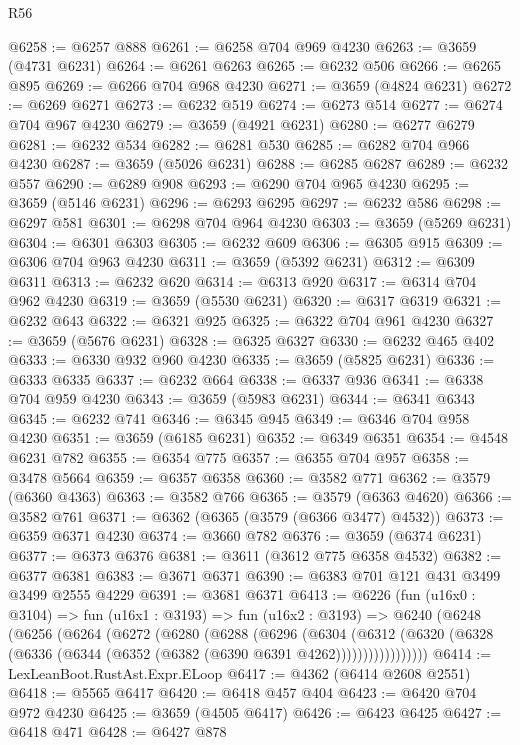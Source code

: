 \begin{lexlean}{R56}
\begin{coremodule}
@6258 := @6257 @888
@6261 := @6258 @704 @969 @4230
@6263 := @3659 (@4731 @6231)
@6264 := @6261 @6263
@6265 := @6232 @506
@6266 := @6265 @895
@6269 := @6266 @704 @968 @4230
@6271 := @3659 (@4824 @6231)
@6272 := @6269 @6271
@6273 := @6232 @519
@6274 := @6273 @514
@6277 := @6274 @704 @967 @4230
@6279 := @3659 (@4921 @6231)
@6280 := @6277 @6279
@6281 := @6232 @534
@6282 := @6281 @530
@6285 := @6282 @704 @966 @4230
@6287 := @3659 (@5026 @6231)
@6288 := @6285 @6287
@6289 := @6232 @557
@6290 := @6289 @908
@6293 := @6290 @704 @965 @4230
@6295 := @3659 (@5146 @6231)
@6296 := @6293 @6295
@6297 := @6232 @586
@6298 := @6297 @581
@6301 := @6298 @704 @964 @4230
@6303 := @3659 (@5269 @6231)
@6304 := @6301 @6303
@6305 := @6232 @609
@6306 := @6305 @915
@6309 := @6306 @704 @963 @4230
@6311 := @3659 (@5392 @6231)
@6312 := @6309 @6311
@6313 := @6232 @620
@6314 := @6313 @920
@6317 := @6314 @704 @962 @4230
@6319 := @3659 (@5530 @6231)
@6320 := @6317 @6319
@6321 := @6232 @643
@6322 := @6321 @925
@6325 := @6322 @704 @961 @4230
@6327 := @3659 (@5676 @6231)
@6328 := @6325 @6327
@6330 := @6232 @465 @402
@6333 := @6330 @932 @960 @4230
@6335 := @3659 (@5825 @6231)
@6336 := @6333 @6335
@6337 := @6232 @664
@6338 := @6337 @936
@6341 := @6338 @704 @959 @4230
@6343 := @3659 (@5983 @6231)
@6344 := @6341 @6343
@6345 := @6232 @741
@6346 := @6345 @945
@6349 := @6346 @704 @958 @4230
@6351 := @3659 (@6185 @6231)
@6352 := @6349 @6351
@6354 := @4548 @6231 @782
@6355 := @6354 @775
@6357 := @6355 @704 @957
@6358 := @3478 @5664
@6359 := @6357 @6358
@6360 := @3582 @771
@6362 := @3579 (@6360 @4363)
@6363 := @3582 @766
@6365 := @3579 (@6363 @4620)
@6366 := @3582 @761
@6371 := @6362 (@6365 (@3579 (@6366 @3477) @4532))
@6373 := @6359 @6371 @4230
@6374 := @3660 @782
@6376 := @3659 (@6374 @6231)
@6377 := @6373 @6376
@6381 := @3611 (@3612 @775 @6358 @4532)
@6382 := @6377 @6381
@6383 := @3671 @6371
@6390 := @6383 @701 @121 @431 @3499 @3499 @2555 @4229
@6391 := @3681 @6371
@6413 := @6226
    (fun (u16x0 : @3104) =>
    fun (u16x1 : @3193) =>
    fun (u16x2 : @3193) =>
    @6240
      (@6248
        (@6256
          (@6264
            (@6272
              (@6280
                (@6288
                  (@6296
                    (@6304
                      (@6312
                        (@6320
                          (@6328 (@6336 (@6344 (@6352 (@6382 (@6390 @6391 @4262)))))))))))))))))
@6414 := LexLeanBoot.RustAst.Expr.ELoop
@6417 := @4362 (@6414 @2608 @2551)
@6418 := @5565 @6417
@6420 := @6418 @457 @404
@6423 := @6420 @704 @972 @4230
@6425 := @3659 (@4505 @6417)
@6426 := @6423 @6425
@6427 := @6418 @471
@6428 := @6427 @878

\end{coremodule}
\end{lexlean}
